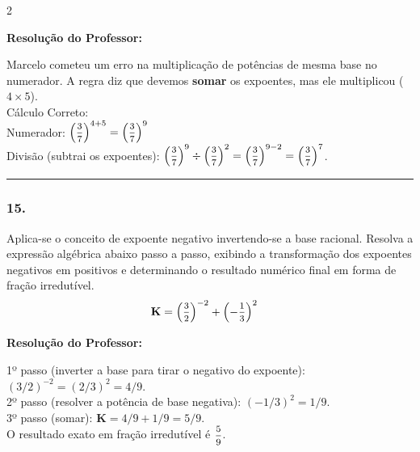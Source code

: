 \begin{multicols*}{2}
\ifgabarito
    \begin{tcolorbox}[colback=CorTitUm!5, colframe=CorTitUm, boxrule=1pt, arc=4pt, left=6pt, right=6pt, top=6pt, bottom=6pt]
    \small\textbf{\textcolor{CorTitUm}{Resolução do Professor:}}\par\vspace{0.1cm}
    \color{CinzaEscuro}
    Marcelo cometeu um erro na multiplicação de potências de mesma base no numerador. A regra diz que devemos \textbf{somar} os expoentes, mas ele multiplicou ($4 \times 5$).\\
    Cálculo Correto:\\
    Numerador: $ \left( \mfrac{3}{7} \right)^{4+5} = \left( \mfrac{3}{7} \right)^{9} $\\
    Divisão (subtrai os expoentes): $ \left( \mfrac{3}{7} \right)^{9} \div \left( \mfrac{3}{7} \right)^{2} = \left( \mfrac{3}{7} \right)^{9-2} = \left( \mfrac{3}{7} \right)^{7} $.
    \end{tcolorbox}
\fi

\par\vspace{\espacoQuestao}
\noindent\textcolor{CorLinha}{\rule{\linewidth}{0.5pt}} 
\par\vspace{\espacoPreQuestao}
\subsubsection*{15.} Aplica-se o conceito de expoente negativo invertendo-se a base racional. Resolva a expressão algébrica abaixo passo a passo, exibindo a transformação dos expoentes negativos em positivos e determinando o resultado numérico final em forma de fração irredutível.
$$
\begin{aligned}
& \textbf{K} = \left( \mfrac{3}{2} \right)^{-2} + \left( -\mfrac{1}{3} \right)^{2}
\end{aligned}
$$

\ifgabarito
    \begin{tcolorbox}[colback=CorTitUm!5, colframe=CorTitUm, boxrule=1pt, arc=4pt, left=6pt, right=6pt, top=6pt, bottom=6pt]
    \small\textbf{\textcolor{CorTitUm}{Resolução do Professor:}}\par\vspace{0.1cm}
    \color{CinzaEscuro}
    1º passo (inverter a base para tirar o negativo do expoente): $ (3/2)^{-2} = (2/3)^{2} = 4/9 $.\\
    2º passo (resolver a potência de base negativa): $ (-1/3)^{2} = 1/9 $.\\
    3º passo (somar): $ \textbf{K} = 4/9 + 1/9 = 5/9 $.\\
    O resultado exato em fração irredutível é $ \mfrac{5}{9} $.
    \end{tcolorbox}
\fi


\end{multicols*}
